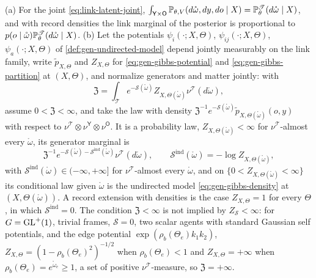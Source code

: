 (a) For the joint \eqref{eq:link-latent-joint},
$\int_{\mathsf Y\times\mathsf O}\mathbb P_{\theta,V}(d\mathring\omega,dy,do\mid X)=\mathbb P^{\mathscr T}_\theta(d\mathring\omega\mid X)$,
and with record densities the link marginal of the posterior is proportional to
$p(o\mid\mathring\omega)\mathbb P^{\mathscr T}_\theta(d\mathring\omega\mid X)$.
(b) Let the potentials $\psi_i(\cdot;X,\Theta)$, $\psi_{ij}(\cdot;X,\Theta)$, $\psi_a(\cdot;X,\Theta)$ of
\cref{def:gen-undirected-model} depend jointly measurably on the link family, write
$\widetilde p_{X,\Theta}$ and $Z_{X,\Theta}$ for \eqref{eq:gen-gibbs-potential} and \eqref{eq:gen-gibbs-partition}
at $(X,\Theta)$, and normalize generators and matter jointly: with
\begin{equation}
\mathfrak Z=\int_{\mathscr T}e^{-\mathscr S(\mathring\omega)}Z_{X,\Theta(\mathring\omega)}\nu^{\mathscr T}(d\mathring\omega),
\label{eq:link-joint-undirected-normalizer}
\end{equation}
assume $0<\mathfrak Z<\infty$, and take the law with density
$\mathfrak Z^{-1}e^{-\mathscr S(\mathring\omega)}\widetilde p_{X,\Theta(\mathring\omega)}(o,y)$ with respect to
$\nu^{\mathscr T}\otimes\nu^{\mathsf Y}\otimes\nu^{\mathsf O}$. It is a probability law,
$Z_{X,\Theta(\mathring\omega)}<\infty$ for $\nu^{\mathscr T}$-almost every $\mathring\omega$, its generator marginal is
\begin{equation}
\mathfrak Z^{-1}e^{-\mathscr S(\mathring\omega)-\mathscr S^{\mathrm{ind}}(\mathring\omega)}\nu^{\mathscr T}(d\mathring\omega),
\qquad
\mathscr S^{\mathrm{ind}}(\mathring\omega)=-\log Z_{X,\Theta(\mathring\omega)},
\label{eq:link-induced-marginal}
\end{equation}
with $\mathscr S^{\mathrm{ind}}(\mathring\omega)\in(-\infty,+\infty]$ for $\nu^{\mathscr T}$-almost every
$\mathring\omega$, and on $\{0<Z_{X,\Theta(\mathring\omega)}<\infty\}$ its conditional law given $\mathring\omega$ is the undirected model
\eqref{eq:gen-gibbs-density} at $(X,\Theta(\mathring\omega))$. A record extension with densities is the case
$Z_{X,\Theta}=1$ for every $\Theta$, in which $\mathscr S^{\mathrm{ind}}=0$. The condition $\mathfrak Z<\infty$ is not
implied by $Z_{\mathscr S}<\infty$: for $G=\mathrm{GL}^+(1)$, trivial frames, $\mathscr S=0$, two scalar agents with
standard Gaussian self potentials, and the edge potential $\exp(\rho_b(\Theta_e)k_1k_2)$,
$Z_{X,\Theta}=(1-\rho_b(\Theta_e)^2)^{-1/2}$ when $\rho_b(\Theta_e)<1$ and $Z_{X,\Theta}=+\infty$ when
$\rho_b(\Theta_e)=e^{\mathring\omega_e}\geq1$, a set of positive $\nu^{\mathscr T}$-measure, so $\mathfrak Z=+\infty$.

